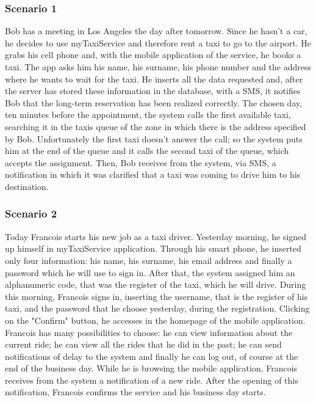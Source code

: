 		\subsubsection{Scenario 1}
		Bob has a meeting in Los Angeles the day after tomorrow. Since he hasn't a car, he decides to use myTaxiService and therefore rent a taxi to go to the airport. He grabs his cell phone and, with the mobile application of the service, he books a taxi. The app asks him his name, his surname, his phone number and the address where he wants to wait for the taxi. He inserts all the data requested and, after the server has stored these information in the database, with a SMS, it notifies Bob that the long-term reservation has been realized correctly. 
		The chosen day, ten minutes before the appointment, the system calls the first available taxi, searching it in the taxis queue of the zone in which there is the address specified by Bob. Unfortunately the first taxi doesn't answer the call; so the system puts him at the end of the queue and it calls the second taxi of the queue, which accepts the assignment. Then, Bob receives from the system, via SMS, a notification in which it was clarified that a taxi was coming to drive him to his destination.
		
		\subsubsection{Scenario 2}
		Today Francois starts his new job as a taxi driver. Yesterday morning, he signed up himself in myTaxiService application. Through his smart phone, he inserted only four information: his name, his surname, his email address and finally a password which he will use to sign in. After that, the system assigned him an alphanumeric code, that was the register of the taxi, which he will drive.
		During this morning, Francois signs in, inserting the username, that is the register of his taxi, and the password that he choose yesterday, during the registration. Clicking on the "Confirm" button, he accesses in the homepage of the mobile application. Francois has many possibilities to choose: he can view information about the current ride; he can view all the rides that he did in the past; he can send notifications of delay to the system and finally he can log out, of course at the end of the business day.
		While he is browsing the mobile application, Francois receives from the system a notification of a new ride. After the opening of this notification, Francois confirms the service and his business day starts.  
		
